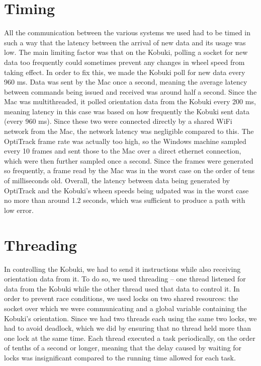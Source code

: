 \documentclass[10pt]{article}
\begin{document}
\begin{multicols*}{2}
  \section*{Timing}
  All the communication between the various systems we used had to be timed in
  such a way that the latency between the arrival of new data and its usage was
  low. The main limiting factor was that on the Kobuki, polling a socket for new
  data too frequently could sometimes prevent any changes in wheel speed from
  taking effect. In order to fix this, we made the Kobuki poll for new data
  every 960 ms. Data was sent by the Mac once a second, meaning the average
  latency between commands being issued and received was around half a second.
  Since the Mac was multithreaded, it polled orientation data from the Kobuki
  every 200 ms, meaning latency in this case was based on how frequently the
  Kobuki sent data (every 960 ms). Since these two were connected directly by a
  shared WiFi network from the Mac, the network latency was negligible compared
  to this. The OptiTrack frame rate was actually too high, so the Windows
  machine sampled every 10 frames and sent those to the Mac over a direct
  ethernet connection, which were then further sampled once a second. Since the
  frames were generated so frequently, a frame read by the Mac was in the worst
  case on the order of tens of milliseconds old. Overall, the latency between
  data being generated by OptiTrack and the Kobuki's wheen speeds being udpated
  was in the worst case no more than around 1.2 seconds, which was sufficient to
  produce a path with low error.

  \section*{Threading}
  In controlling the Kobuki, we had to send it instructions while also receiving
  orientation data from it. To do so, we used threading -- one thread listened
  for data from the Kobuki while the other thread used that data to control it.
  In order to prevent race conditions, we used locks on two shared resources:
  the socket over which we were communicating and a global variable containing
  the Kobuki's orientation. Since we had two threads each using the same two
  locks, we had to avoid deadlock, which we did by ensuring that no thread held
  more than one lock at the same time. Each thread executed a task periodically,
  on the order of tenths of a second or longer, meaning that the delay caused by
  waiting for locks was insignificant compared to the running time allowed for
  each task.


\end{multicols*}
\end{document}
